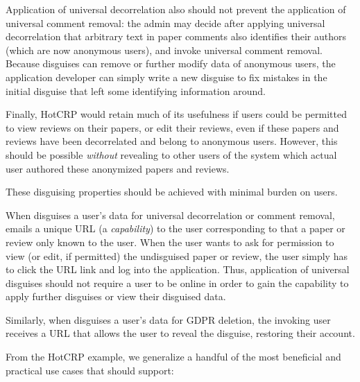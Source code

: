 Application of universal decorrelation also should not prevent the application of universal comment
removal: the admin may decide after applying universal decorrelation that arbitrary text in paper
comments also identifies their authors (which are now anonymous users), and invoke universal comment
removal. 
Because disguises can remove or further modify data of anonymous users, the application developer
can simply write a new disguise to fix mistakes in the initial disguise that left some identifying
information around.

Finally, HotCRP would retain much of its usefulness if users could be permitted to view reviews on
their papers, or edit their reviews, even if these papers and reviews have been decorrelated and
belong to anonymous users.  However, this should be possible \emph{without} revealing to other users
of the system which actual user authored these anonymized papers and reviews.

 These disguising properties should be achieved with minimal burden on
users. 

When \sys disguises a user's data for universal decorrelation or comment removal, \sys emails a
unique URL (a \emph{capability}) to the user corresponding to that a paper or review only known to
the user. When the user wants to ask for permission to view (or edit, if permitted) the undisguised
paper or review, the user simply has to click the URL link and log into the application. Thus,
application of universal disguises should not require a user to be online in order to gain the
capability to apply further disguises or view their disguised data.

Similarly, when \sys disguises a user's data for GDPR deletion, the invoking user receives a URL
that allows the user to reveal the disguise, restoring their account.

From the HotCRP example, we generalize a handful of the most beneficial and practical use cases
that \sys should support:

